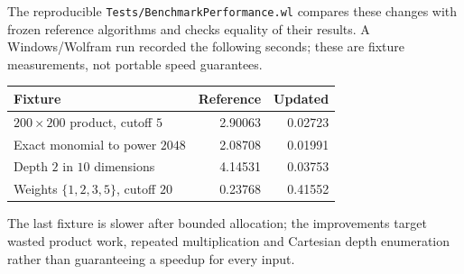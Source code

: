 The reproducible \texttt{Tests/BenchmarkPerformance.wl} compares these changes with frozen reference algorithms and checks equality of their results. A Windows/Wolfram run recorded the following seconds; these are fixture measurements, not portable speed guarantees.
\begin{center}
\begin{tabular}{@{}lrr@{}}
\toprule
Fixture & Reference & Updated\\
\midrule
$200\times200$ product, cutoff $5$ & 2.90063 & 0.02723\\
Exact monomial to power $2048$ & 2.08708 & 0.01991\\
Depth $2$ in $10$ dimensions & 4.14531 & 0.03753\\
Weights $\{1,2,3,5\}$, cutoff $20$ & 0.23768 & 0.41552\\
\bottomrule
\end{tabular}
\end{center}
The last fixture is slower after bounded allocation; the improvements target wasted product work, repeated multiplication and Cartesian depth enumeration rather than guaranteeing a speedup for every input.
